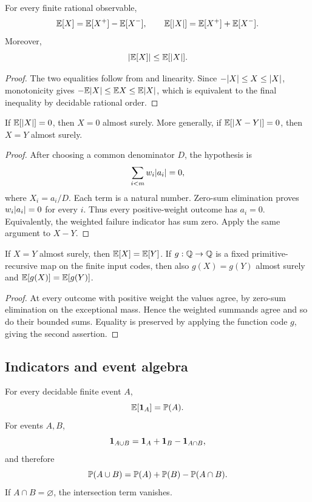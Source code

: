 \begin{theorem}\label{thm:expect-parts}
For every finite rational observable,
\[
 \mathbb E[X]=\mathbb E[X^+]-\mathbb E[X^-],\qquad
 \mathbb E[\lvert X\rvert]=\mathbb E[X^+]+\mathbb E[X^-].
\]
Moreover,
\[
 \lvert \mathbb E[X]\rvert\le\mathbb E[\lvert X\rvert].
\]
\end{theorem}

\begin{proof}
The two equalities follow from  and linearity.  Since
\(-\lvert X\rvert\le X\le\lvert X\rvert\), monotonicity gives
\(-\mathbb E\lvert X\rvert\le\mathbb E X\le\mathbb E\lvert X\rvert\), which is equivalent to the final
inequality by decidable rational order.
\end{proof}

\begin{theorem}\label{thm:zero-abs}
If \(\mathbb E[\lvert X\rvert]=0\), then \(X=0\) almost surely.  More generally, if
\(\mathbb E[\lvert X-Y\rvert]=0\), then \(X=Y\) almost surely.
\end{theorem}

\begin{proof}
After choosing a common denominator \(D\), the hypothesis is
\[
 \sum_{i<m}w_i\lvert a_i\rvert=0,
\]
where \(X_i=a_i/D\).  Each term is a natural number.  Zero-sum elimination
proves \(w_i\lvert a_i\rvert=0\) for every \(i\).  Thus every positive-weight outcome
has \(a_i=0\).  Equivalently, the weighted failure indicator has sum zero.
Apply the same argument to \(X-Y\).
\end{proof}

\begin{theorem}\label{thm:ae-congruence}
If \(X=Y\) almost surely, then \(\mathbb E[X]=\mathbb E[Y]\).  If
\(g:\mathbb Q\to\mathbb Q\) is a fixed primitive-recursive map on the finite input codes,
then also \(g(X)=g(Y)\) almost surely and \(\mathbb E[g(X)]=\mathbb E[g(Y)]\).
\end{theorem}

\begin{proof}
At every outcome with positive weight the values agree, by zero-sum
elimination on the exceptional mass.  Hence the weighted summands agree and so
do their bounded sums.  Equality is preserved by applying the function code
\(g\), giving the second assertion.
\end{proof}

\subsection{Indicators and event algebra}

\begin{theorem}\label{thm:indicator}
For every decidable finite event \(A\),
\[
 \mathbb E[\mathbf 1_A]=\mathbb P(A).
\]
For events \(A,B\),
\[
 \mathbf 1_{A\cup B}=\mathbf 1_A+\mathbf 1_B-\mathbf 1_{A\cap B},
\]
and therefore
\[
 \mathbb P(A\cup B)=\mathbb P(A)+\mathbb P(B)-\mathbb P(A\cap B).
\]
If \(A\cap B=\varnothing\), the intersection term vanishes.
\end{theorem}

